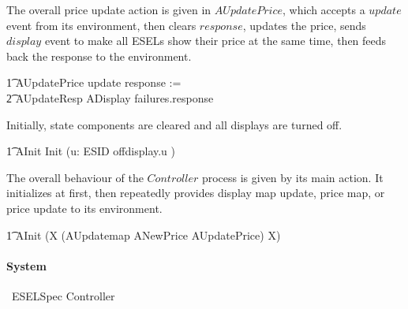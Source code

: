 \begin{circusaction}
\end{circusaction}

The overall price update action is given in $AUpdatePrice$, which accepts a $update$ event from its environment, then clears $response$, updates the price, sends $display$ event to make all ESELs show their price at the same time, then feeds back the response to the environment.
\begin{circusaction}
        \t1 AUpdatePrice \circdef update \then response := \emptyset \circseq \\
            \t2 AUpdateResp \circseq ADisplay \circseq failures.response \then \Skip \\ 
\end{circusaction}

Initially, state components are cleared and all displays are turned off.
\begin{circusaction}
    \t1 AInit \circdef \lschexpract Init \rschexpract \circseq (\Interleave u: ESID \linter \emptyset \rinter \circspot offdisplay.u \then \Skip) \\
\end{circusaction}

The overall behaviour of the $Controller$ process is given by its main action. It initializes at first, then repeatedly provides display map update, price map, or price update to its environment.
\begin{circusaction}
	\t1 \circspot AInit \circseq (\circmu X \circspot (AUpdatemap \extchoice ANewPrice \extchoice AUpdatePrice) \circseq X) \\
\end{circusaction}

\begin{circus}
	\circend
\end{circus}

\paragraph{System}

\begin{circus}
    \circprocess\ ESELSpec \circdef  Controller 
\end{circus}
